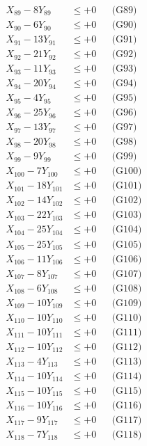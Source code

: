 \documentclass[a4paper,10pt]{article}
\begin{document}
{\begin{align}
X_{89} - 8Y_{89} &\leq +0 && \text{(G89)} \\
X_{90} - 6Y_{90} &\leq +0 && \text{(G90)} \\
X_{91} - 13Y_{91} &\leq +0 && \text{(G91)} \\
X_{92} - 21Y_{92} &\leq +0 && \text{(G92)} \\
X_{93} - 11Y_{93} &\leq +0 && \text{(G93)} \\
X_{94} - 20Y_{94} &\leq +0 && \text{(G94)} \\
X_{95} - 4Y_{95} &\leq +0 && \text{(G95)} \\
X_{96} - 25Y_{96} &\leq +0 && \text{(G96)} \\
X_{97} - 13Y_{97} &\leq +0 && \text{(G97)} \\
\allowbreak
X_{98} - 20Y_{98} &\leq +0 && \text{(G98)} \\
X_{99} - 9Y_{99} &\leq +0 && \text{(G99)} \\
X_{100} - 7Y_{100} &\leq +0 && \text{(G100)} \\
X_{101} - 18Y_{101} &\leq +0 && \text{(G101)} \\
X_{102} - 14Y_{102} &\leq +0 && \text{(G102)} \\
X_{103} - 22Y_{103} &\leq +0 && \text{(G103)} \\
X_{104} - 25Y_{104} &\leq +0 && \text{(G104)} \\
X_{105} - 25Y_{105} &\leq +0 && \text{(G105)} \\
X_{106} - 11Y_{106} &\leq +0 && \text{(G106)} \\
X_{107} - 8Y_{107} &\leq +0 && \text{(G107)} \\
\allowbreak
X_{108} - 6Y_{108} &\leq +0 && \text{(G108)} \\
X_{109} - 10Y_{109} &\leq +0 && \text{(G109)} \\
X_{110} - 10Y_{110} &\leq +0 && \text{(G110)} \\
X_{111} - 10Y_{111} &\leq +0 && \text{(G111)} \\
X_{112} - 10Y_{112} &\leq +0 && \text{(G112)} \\
X_{113} - 4Y_{113} &\leq +0 && \text{(G113)} \\
X_{114} - 10Y_{114} &\leq +0 && \text{(G114)} \\
X_{115} - 10Y_{115} &\leq +0 && \text{(G115)} \\
X_{116} - 10Y_{116} &\leq +0 && \text{(G116)} \\
X_{117} - 9Y_{117} &\leq +0 && \text{(G117)} \\
\allowbreak
X_{118} - 7Y_{118} &\leq +0 && \text{(G118)} \\

\end{align}}
\end{document}
